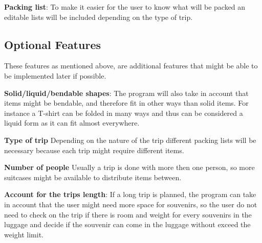 \textbf{Packing list}:
To make it easier for the user to know what will be packed an editable lists will be included depending on the type of trip.
\newline

\subsection{Optional Features}
These features as mentioned above, are additional features that might be able to be implemented later if possible.\newline

\textbf{Solid/liquid/bendable shapes}:
The program will also take in account that items might be bendable, and therefore fit in other ways than solid items. For instance a T-shirt can be folded in many ways and thus can be considered a liquid form as it can fit almost everywhere.
\newline

\textbf{Type of trip}
Depending on the nature of the trip different packing lists will be necessary because each trip might require different items.
\newline

\textbf{Number of people}
Usually a trip is done with more then one person, so more suitcases might be available to distribute items between.
\newline

\textbf{Account for the trips length}:
If a long trip is planned, the program can take in account that the user might need more space for souvenirs, so the user do not need to check on the trip if there is room and weight for every souvenirs in the luggage and decide if the souvenir can come in the luggage without exceed the weight limit.
\newline
